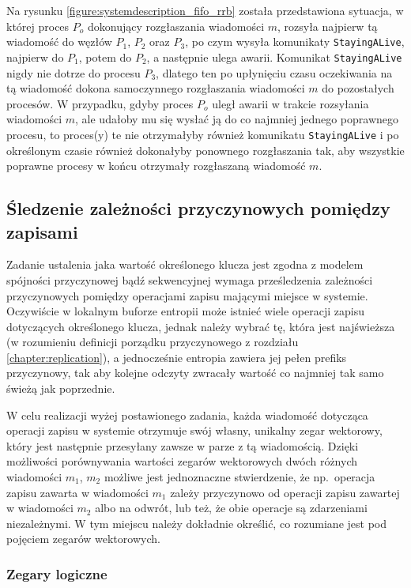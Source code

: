 Na rysunku \ref{figure:systemdescription_fifo_rrb} została przedstawiona sytuacja, w której proces $ P_o $ dokonujący rozgłaszania wiadomości $ m $, rozsyła najpierw tą wiadomość do węzłów $ P_1 $, $ P_2 $ oraz $ P_3 $, po czym wysyła komunikaty \texttt{StayingALive}, najpierw do $ P_1 $, potem do $ P_2 $, a następnie ulega awarii. Komunikat \texttt{StayingALive} nigdy nie dotrze do procesu $ P_3 $, dlatego ten po upłynięciu czasu oczekiwania na tą wiadomość dokona samoczynnego rozgłaszania wiadomości $ m $ do pozostałych procesów. W przypadku, gdyby proces $ P_o $ uległ awarii w trakcie rozsyłania wiadomości $ m $, ale udałoby mu się wysłać ją do co najmniej jednego poprawnego procesu, to proces(y) te nie otrzymałyby również komunikatu \texttt{StayingALive} i po określonym czasie również dokonałyby ponownego rozgłaszania tak, aby wszystkie poprawne procesy w końcu otrzymały rozgłaszaną wiadomość $ m $.

\subsection{Śledzenie zależności przyczynowych pomiędzy zapisami}

Zadanie ustalenia jaka wartość określonego klucza jest zgodna z modelem spójności przyczynowej bądź sekwencyjnej wymaga prześledzenia zależności przyczynowych pomiędzy operacjami zapisu mającymi miejsce w systemie. Oczywiście w lokalnym buforze entropii może istnieć wiele operacji zapisu dotyczących określonego klucza, jednak należy wybrać tę, która jest najświeższa (w rozumieniu definicji porządku przyczynowego z rozdziału \ref{chapter:replication}), a jednocześnie entropia zawiera jej pełen prefiks przyczynowy, tak aby kolejne odczyty zwracały wartość co najmniej tak samo świeżą jak poprzednie.

W celu realizacji wyżej postawionego zadania, każda wiadomość dotycząca operacji zapisu w systemie
otrzymuje swój własny, unikalny zegar wektorowy, który jest następnie przesyłany zawsze w parze z tą
wiadomością. Dzięki możliwości porównywania wartości zegarów wektorowych dwóch różnych wiadomości $
m_1 $, $ m_2 $ możliwe jest jednoznaczne stwierdzenie, że np.\ operacja zapisu zawarta w wiadomości $ m_1 $ zależy przyczynowo od operacji zapisu zawartej w wiadomości $ m_2 $ albo na odwrót, lub też, że obie operacje są zdarzeniami niezależnymi. W tym miejscu należy dokładnie określić, co rozumiane jest pod pojęciem zegarów wektorowych.

\subsubsection{Zegary logiczne}

